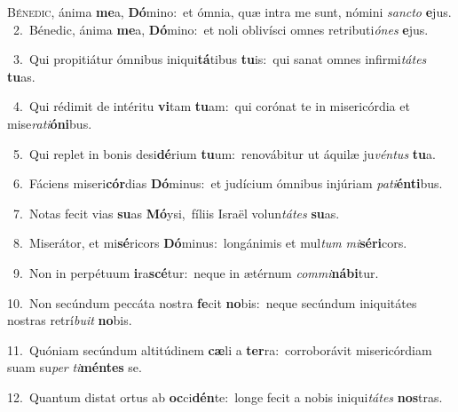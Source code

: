 \lettrine{\initial\textcolor{\initialcolor}{B}}{énedic,} ánima \textbf{me}\-a, \textbf{Dó}\-mino:~\star et ómnia, quæ intra me sunt, nómini \textit{sanc}\-\textit{to} \textbf{e}\-jus.\\
{\numbfont\textcolor{\numbcolor}{~2.}}~Bénedic, ánima \textbf{me}\-a, \textbf{Dó}\-mino:~\star et noli oblivísci omnes retributi\-\textit{ó}\-\textit{nes} \textbf{e}\-jus.\par
{\numbfont\textcolor{\numbcolor}{~3.}}~Qui propitiátur ómnibus iniqui\-\textbf{tá}\-tibus \textbf{tu}\-is:~\star qui sanat omnes infirmi\-\textit{tá}\-\textit{tes} \textbf{tu}\-as.\par
{\numbfont\textcolor{\numbcolor}{~4.}}~Qui rédimit de intéritu \textbf{vi}\-tam \textbf{tu}\-am:~\star qui corónat te in misericórdia et mise\-\textit{ra}\-\textit{ti}\textbf{ó}\textbf{ni}bus.\par
{\numbfont\textcolor{\numbcolor}{~5.}}~Qui replet in bonis desi\-\textbf{dé}\-rium \textbf{tu}\-um:~\star renovábitur ut áquilæ ju\-\textit{vén}\-\textit{tus} \textbf{tu}\-a.\par
{\numbfont\textcolor{\numbcolor}{~6.}}~Fáciens miseri\-\textbf{cór}\-dias \textbf{Dó}\-minus:~\star et judícium ómnibus injúriam \textit{pa}\-\textit{ti}\textbf{én}\textbf{ti}bus.\par
{\numbfont\textcolor{\numbcolor}{~7.}}~Notas fecit vias \textbf{su}\-as \textbf{Mó}\-ysi,~\star fíliis Israël volun\-\textit{tá}\-\textit{tes} \textbf{su}\-as.\par
{\numbfont\textcolor{\numbcolor}{~8.}}~Miserátor, et mi\-\textbf{sé}\-ricors \textbf{Dó}\-minus:~\star longánimis et mul\textit{tum} \textit{mi}\-\textbf{sé}\textbf{ri}cors.\par
{\numbfont\textcolor{\numbcolor}{~9.}}~Non in perpétuum \textbf{i}\-ra\-\textbf{scé}\-tur:~\star neque in ætérnum \textit{com}\-\textit{mi}\textbf{ná}\textbf{bi}tur.\par
{\numbfont\textcolor{\numbcolor}{10.}}~Non secúndum peccáta nostra \textbf{fe}\-cit \textbf{no}\-bis:~\star neque secúndum iniquitátes nostras retrí\-\textit{bu}\-\textit{it} \textbf{no}\-bis.\par
{\numbfont\textcolor{\numbcolor}{11.}}~Quóniam secúndum altitúdinem \textbf{cæ}\-li a \textbf{ter}\-ra:~\star corroborávit misericórdiam suam su\textit{per} \textit{ti}\-\textbf{mén}\textbf{tes} se.\par
{\numbfont\textcolor{\numbcolor}{12.}}~Quantum distat ortus ab \textbf{oc}\-ci\-\textbf{dén}\-te:~\star longe fecit a nobis iniqui\-\textit{tá}\-\textit{tes} \textbf{nos}\-tras.\par
